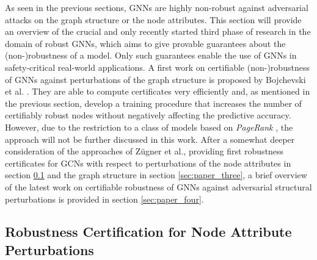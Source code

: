 \documentclass[a4paper,preprint]{sig-alternate}
\begin{document}
As seen in the previous sections, GNNs are highly non-robust against adversarial attacks on the graph
structure or the node attributes. This section will provide an overview of the crucial and only recently started 
third phase of research in the domain of robust GNNs, which aims to give provable guarantees about the (non-)robustness of a model.
Only such guarantees enable the use of GNNs in safety-critical real-world applications.\newline
A first work on certifiable (non-)robustness of GNNs against perturbations of the graph structure
is proposed by Bojchevski et al. \cite{bojchevski2019certifiable}. They are able to compute certificates very efficiently
and, as mentioned in the previous section, develop a training procedure that increases the number of certifiably robust nodes without
negatively affecting the predictive accuracy. However, due to the restriction to a class of models
based on \textit{PageRank} \cite{10.1145/3394486.3403217}, the approach will not be further discussed in this work.\newline 
After a somewhat deeper consideration of the approaches of Zügner et al., providing first robustness certificates for GCNs with respect to 
perturbations of the node attributes in section \ref{sec:paper_two} and the graph structure in section \ref{sec:paper_three},
a brief overview of the latest work on certifiable robustness of GNNs against adversarial structural perturbations is provided 
in section \ref{sec:paper_four}.

\subsection{Robustness Certification for Node Attribute Perturbations}
\label{sec:paper_two}
\end{document}
